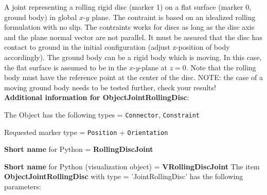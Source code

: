 \label{sec:item:ObjectJointRollingDisc}
A joint representing a rolling rigid disc (marker 1) on a flat surface (marker 0, ground body) in global $x$-$y$ plane. The contraint is based on an idealized rolling formulation with no slip. The contraints works for discs as long as the disc axis and the plane normal vector are not parallel. It must be assured that the disc has contact to ground in the initial configuration (adjust z-position of body accordingly). The ground body can be a rigid body which is moving. In this case, the flat surface is assumed to be in the $x$-$y$-plane at $z=0$. Note that the rolling body must have the reference point at the center of the disc. NOTE: the case of a moving ground body needs to be tested further, check your results!\vspace{12pt}
 \\{\bf Additional information for ObjectJointRollingDisc}:
\bi
  \item The Object has the following types = \texttt{Connector}, \texttt{Constraint}
  \item Requested marker type = \texttt{Position} + \texttt{Orientation}
  \item {\bf Short name} for Python = {\bf RollingDiscJoint}  \item {\bf Short name} for Python (visualization object) = {\bf VRollingDiscJoint}\ei
\vspace{12pt} \noindent The item {\bf ObjectJointRollingDisc} with type = 'JointRollingDisc' has the following parameters:\vspace{-1cm}\\ 
